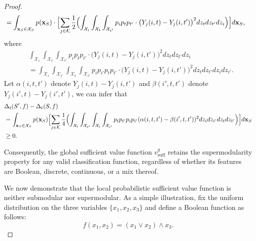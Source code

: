 \documentclass{article}
\newcommand{\x}{\textbf{x}}
\newcommand{\fml}[1]{{\mathcal{#1}}}
\begin{document}
\begin{proof}
\begin{equation}
\begin{aligned}
%
&= \int_{\x_{S} \in \fml{X}_{S}} p(\x_{S}) \cdot \Bigl[ \sum_{j\in \fml{K}} \frac{1}{2} \Bigl(
\int_{\fml{X}_i} \int_{\fml{X}_t} \int_{\fml{X}_{t'}} p_{i} p_{t} p_{t'} \cdot \bigl(Y_{j}(i,t) - Y_{j}(i,t')\bigr)^2 dz_t dz_{t'} dz_i \Bigr) \Bigr] d\x_{S},
\end{aligned}
\end{equation}
%
where
\begin{align*}
&\int_{\fml{X}_i} \int_{\fml{X}_t} \int_{\fml{X}_{t'}} p_{i} p_{t} p_{t'} \cdot \bigl(Y_{j}(i,t) - Y_{j}(i,t')\bigr)^2 dz_t dz_{t'} dz_i \\
&= \int_{\fml{X}_i} \int_{\fml{X}_{i'}} \int_{\fml{X}_t} \int_{\fml{X}_{t'}} p_{i} p_{i'} p_{t} p_{t'} \cdot \bigl(Y_{j}(i,t) - Y_{j}(i,t')\bigr)^2 dz_t dz_{t'} dz_i dz_{i'}.
\end{align*}
%
Let $\alpha(i,t,t')$ denote $Y_{j}(i,t) - Y_{j}(i,t')$ and $\beta(i',t,t')$ denote $Y_{j}(i',t) - Y_{j}(i',t')$, we can infer that
\begin{equation}
\begin{aligned}
&\Delta_{t}(S',f) - \Delta_{t}(S,f) \\
&= \int_{\x_{S} \in \fml{X}_{S}} p(\x_{S}) \Bigl[ \sum_{j\in \fml{K}} \frac{1}{4} \Bigl( 
\int_{\fml{X}_t} \int_{\fml{X}_{t'}} \int_{\fml{X}_{i}} \int_{\fml{X}_{i'}} p_{t} p_{t'} p_{i} p_{i'}
(\alpha(i,t,t') - \beta(i',t,t'))^2 dz_i dz_{i'} dz_t dz_{t'}
 \Bigr) \Bigr] d\x_{S} \\
 &\ge 0.
\end{aligned}
\end{equation}

Consequently, the global sufficient value function $v^g_{\text{suff}}$ retains the supermodularity property for any valid classification function, regardless of whether its features are Boolean, discrete, continuous, or a mix thereof.



We now demonstrate that the local probabilistic sufficient value function is neither submodular nor supermodular.
As a simple illustration, fix the uniform distribution on the three variables $\{x_1, x_2, x_3\}$
and define a Boolean function as follows:
\begin{equation}
f(x_1,x_2) = (x_1 \lor x_2) \land x_3.
\end{equation}


\end{proof}
\end{document}
